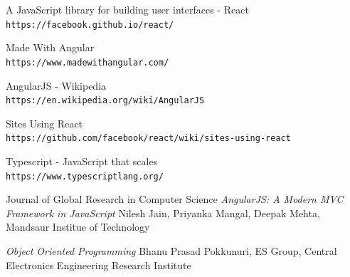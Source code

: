 \documentclass[a4paper,12pt,twoside]{article} %
\begin{document}
\begin{thebibliography}{9}

A JavaScript library for building user interfaces - React
\\\texttt{https://facebook.github.io/react/}

Made With Angular
\\\texttt{https://www.madewithangular.com/}

AngularJS - Wikipedia
\\\texttt{https://en.wikipedia.org/wiki/AngularJS}

Sites Using React
\\\texttt{https://github.com/facebook/react/wiki/sites-using-react}

Typescript - JavaScript that scales
\\\texttt{https://www.typescriptlang.org/}

Journal of Global Research in Computer Science
\textit{AngularJS: A Modern MVC Framework in JavaScript}
Nilesh Jain, Priyanka Mangal, Deepak Mehta,
Mandsaur Institue of Technology

\textit{Object Oriented Programming}
Bhanu Prasad Pokkunuri, ES Group, Central Electronics Engineering Research Institute

\end{thebibliography}
\end{document}
